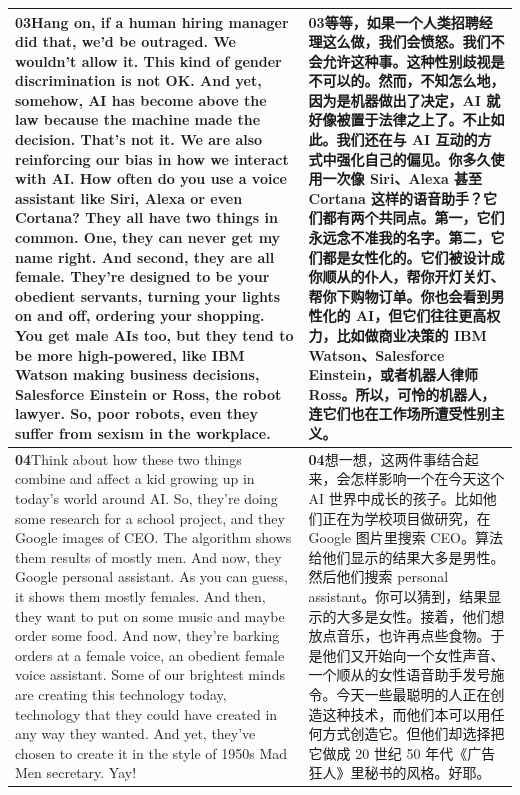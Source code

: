\documentclass[UTF8,zihao=-4,fontset=fandol]{ctexart}
\newcommand{\TranscriptColumn}{\raggedright\arraybackslash\hyphenpenalty=10000\exhyphenpenalty=10000\sloppy}
\begin{document}
\begin{longtable}{>{\TranscriptColumn}p{} >{\TranscriptColumn}p{}}
\textbf{03}\quad Hang on, if a human hiring manager did that, we'd be outraged. We wouldn't allow it. This kind of gender discrimination is not OK. And yet, somehow, AI has become above the law because the machine made the decision. That's not it. We are also reinforcing our bias in how we interact with AI. How often do you use a voice assistant like Siri, Alexa or even Cortana? They all have two things in common. One, they can never get my name right. And second, they are all female. They're designed to be your obedient servants, turning your lights on and off, ordering your shopping. You get male AIs too, but they tend to be more high-powered, like IBM Watson making business decisions, Salesforce Einstein or Ross, the robot lawyer. So, poor robots, even they suffer from sexism in the workplace. & \textbf{03}\quad 等等，如果一个人类招聘经理这么做，我们会愤怒。我们不会允许这种事。这种性别歧视是不可以的。然而，不知怎么地，因为是机器做出了决定，AI 就好像被置于法律之上了。不止如此。我们还在与 AI 互动的方式中强化自己的偏见。你多久使用一次像 Siri、Alexa 甚至 Cortana 这样的语音助手？它们都有两个共同点。第一，它们永远念不准我的名字。第二，它们都是女性化的。它们被设计成你顺从的仆人，帮你开灯关灯、帮你下购物订单。你也会看到男性化的 AI，但它们往往更高权力，比如做商业决策的 IBM Watson、Salesforce Einstein，或者机器人律师 Ross。所以，可怜的机器人，连它们也在工作场所遭受性别主义。 \\ \hline
\textbf{04}\quad Think about how these two things combine and affect a kid growing up in today's world around AI. So, they're doing some research for a school project, and they Google images of CEO. The algorithm shows them results of mostly men. And now, they Google personal assistant. As you can guess, it shows them mostly females. And then, they want to put on some music and maybe order some food. And now, they're barking orders at a female voice, an obedient female voice assistant. Some of our brightest minds are creating this technology today, technology that they could have created in any way they wanted. And yet, they've chosen to create it in the style of 1950s Mad Men secretary. Yay! & \textbf{04}\quad 想一想，这两件事结合起来，会怎样影响一个在今天这个 AI 世界中成长的孩子。比如他们正在为学校项目做研究，在 Google 图片里搜索 CEO。算法给他们显示的结果大多是男性。然后他们搜索 personal assistant。你可以猜到，结果显示的大多是女性。接着，他们想放点音乐，也许再点些食物。于是他们又开始向一个女性声音、一个顺从的女性语音助手发号施令。今天一些最聪明的人正在创造这种技术，而他们本可以用任何方式创造它。但他们却选择把它做成 20 世纪 50 年代《广告狂人》里秘书的风格。好耶。 \\ \hline

\end{longtable}
\end{document}
